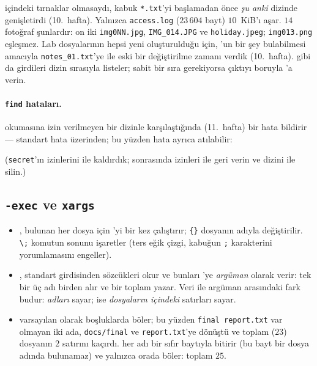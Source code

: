  içindeki tırnaklar olmasaydı, kabuk \texttt{*.txt}'yi  başlamadan önce \emph{şu anki} dizinde genişletirdi (10.~hafta). Yalnızca \texttt{access.log} ($23\,604$ bayt) $10$~KiB'ı aşar. $14$ fotoğraf şunlardır: on iki \texttt{img0NN.jpg}, \texttt{IMG\_014.JPG} ve \texttt{holiday.jpeg}; \texttt{img013.png} eşleşmez. Lab dosyalarının hepsi yeni oluşturulduğu için, 'un bir şey bulabilmesi amacıyla \texttt{notes\_01.txt}'ye  ile eski bir değiştirilme zamanı verdik (10.~hafta).  gibi  da girdileri dizin sırasıyla listeler; sabit bir sıra gerekiyorsa çıktıyı boruyla 'a verin.

\paragraph{\texttt{find} hataları.}  okumasına izin verilmeyen bir dizinle karşılaştığında (11.~hafta) bir hata bildirir --- standart hata üzerinden; bu yüzden hata ayrıca atılabilir:

(\texttt{secret}'ın izinlerini  ile kaldırdık; sonrasında izinleri  ile geri verin ve dizini  ile silin.)

\subsection{\texttt{-exec} ve \texttt{xargs}}



\begin{itemize}
  \item {}, bulunan her dosya için 'yi bir kez çalıştırır; \texttt{\{\}} dosyanın adıyla değiştirilir. \texttt{\textbackslash;} komutun sonunu işaretler (ters eğik çizgi, kabuğun \texttt{;} karakterini yorumlamasını engeller).
  \item {}, standart girdisinden sözcükleri okur ve bunları 'ye \emph{argüman} olarak verir: tek bir  üç adı birden alır ve bir toplam yazar. Veri ile argüman arasındaki fark budur:  \emph{adları} sayar;  ise \emph{dosyaların içindeki} satırları sayar.
  \item {} varsayılan olarak boşluklarda böler; bu yüzden \texttt{final report.txt} var olmayan iki ada, \texttt{docs/\allowbreak final} ve \texttt{report.txt}'ye dönüştü ve toplam ($23$) dosyanın $2$ satırını kaçırdı.  her adı bir sıfır baytıyla bitirir (bu bayt bir dosya adında bulunamaz) ve  yalnızca orada böler: toplam $25$.
\end{itemize}

